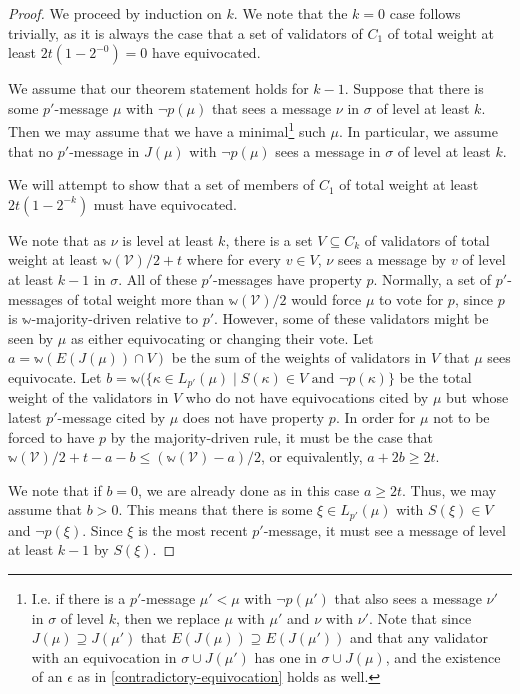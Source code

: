 \documentclass[12pt]{article}
\begin{document}
\begin{proof}
We proceed by induction on $k$. We note that the $k=0$ case follows trivially, as it is always the case that a set of validators of $C_1$ of total weight at least $2t(1-2^{-0})=0$ have equivocated.

  We assume that our theorem statement holds for $k-1$. Suppose that there is some $p'$-message $\mu$ with $\neg p(\mu)$ that sees a message $\nu$ in $\sigma$ of level at least $k$. Then we may assume that we have a minimal\footnote{I.e. if there is a $p'$-message $\mu' < \mu$ with $\neg p(\mu')$ that also sees a message $\nu'$ in $\sigma$ of level $k$, then we replace $\mu$ with $\mu'$ and $\nu$ with $\nu'$. Note that since $J(\mu)\supseteq J(\mu')$ that $E(J(\mu))\supseteq E(J(\mu'))$ and that any validator with an equivocation in $\sigma\cup J(\mu')$ has one in $\sigma\cup J(\mu)$, and the existence of an $\epsilon$ as in \ref{contradictory-equivocation} holds as well.} such $\mu$. In particular, we assume that no $p'$-message in $J(\mu)$ with $\neg p(\mu)$ sees a message in $\sigma$ of level at least $k$.

We will attempt to show that a set of members of $C_1$ of total weight at least $2t(1-2^{-k})$ must have equivocated.

  We note that as $\nu$ is level at least $k$, there is a set $V\subseteq C_k$ of validators of total weight at least $\mathbb{w}(\mathcal{V})/2+t$ where for every $v\in V$, $\nu$ sees a message by $v$ of level at least $k-1$ in $\sigma$. All of these $p'$-messages have property $p$. Normally, a set of $p'$-messages of total weight more than $\mathbb{w}(\mathcal{V})/2$ would force $\mu$ to vote for $p$, since $p$ is $\mathbb{w}$-majority-driven relative to $p'$. However, some of these validators might be seen by $\mu$ as either equivocating or changing their vote. Let $a = \mathbb{w}(E(J(\mu)) \cap V)$ be the sum of the weights of validators in $V$ that $\mu$ sees equivocate. Let $b = \mathbb{w}(\{\kappa \in L_{p'}(\mu) \mid S(\kappa) \in V \text{ and } \neg p(\kappa)\}$ be the total weight of the validators in $V$ who do not have equivocations cited by $\mu$ but whose latest $p'$-message cited by $\mu$ does not have property $p$. In order for $\mu$ not to be forced to have $p$ by the majority-driven rule, it must be the case that $\mathbb{w}(\mathcal{V})/2+t-a-b \leq (\mathbb{w}(\mathcal{V})-a)/2$, or equivalently, $a+2b \geq 2t$.

  We note that if $b=0$, we are already done as in this case $a\geq 2t$. Thus, we may assume that $b > 0$. This means that there is some $\xi \in L_{p'}(\mu)$ with $S(\xi) \in V$ and $\neg p(\xi)$. Since $\xi$ is the most recent $p'$-message, it must see a message of level at least $k - 1$ by $S(\xi)$.


\end{proof}
\end{document}
